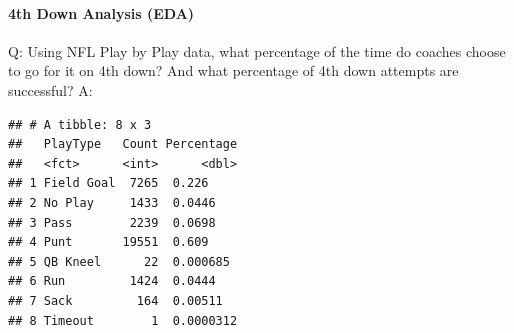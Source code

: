 \documentclass[]{article}
\newenvironment{Shaded}{\begin{snugshade}}{\end{snugshade}}
\newcommand{\CommentTok}[1]{\textcolor[rgb]{0.56,0.35,0.01}{\textit{#1}}}
\newcommand{\DataTypeTok}[1]{\textcolor[rgb]{0.13,0.29,0.53}{#1}}
\newcommand{\DecValTok}[1]{\textcolor[rgb]{0.00,0.00,0.81}{#1}}
\newcommand{\KeywordTok}[1]{\textcolor[rgb]{0.13,0.29,0.53}{\textbf{#1}}}
\newcommand{\NormalTok}[1]{#1}
\newcommand{\OperatorTok}[1]{\textcolor[rgb]{0.81,0.36,0.00}{\textbf{#1}}}
\newcommand{\StringTok}[1]{\textcolor[rgb]{0.31,0.60,0.02}{#1}}
\let\oldparagraph\paragraph
\renewcommand{\paragraph}[1]{\oldparagraph{#1}\mbox{}}
\begin{document}
\hypertarget{th-down-analysis-eda}{%
\paragraph{4th Down Analysis (EDA)}\label{th-down-analysis-eda}}

Q: Using NFL Play by Play data, what percentage of the time do coaches
choose to go for it on 4th down? And what percentage of 4th down
attempts are successful? A:

\begin{Shaded}
\end{Shaded}

\begin{verbatim}
## # A tibble: 8 x 3
##   PlayType   Count Percentage
##   <fct>      <int>      <dbl>
## 1 Field Goal  7265  0.226    
## 2 No Play     1433  0.0446   
## 3 Pass        2239  0.0698   
## 4 Punt       19551  0.609    
## 5 QB Kneel      22  0.000685 
## 6 Run         1424  0.0444   
## 7 Sack         164  0.00511  
## 8 Timeout        1  0.0000312
\end{verbatim}
\end{document}
